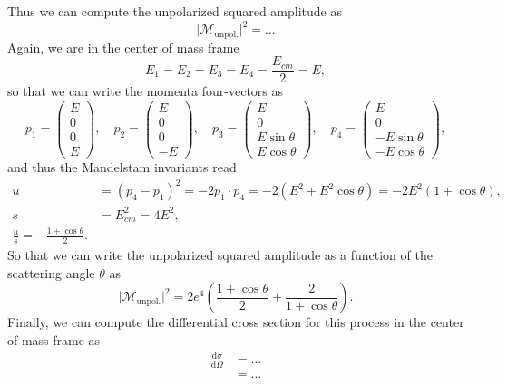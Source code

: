 Thus we can compute the unpolarized squared amplitude as
\[
    \vert \mathcal{M}_{\text{unpol.}} \vert^2 = \dots
\]
Again, we are in the center of mass frame
\[
    E_1 = E_2 = E_3 = E_4 = \frac{E_{cm}}{2} = E,
\]
so that we can write the momenta four-vectors as
\[
    p_1 = \begin{pmatrix}
        E \\
        0 \\
        0 \\
        E
    \end{pmatrix}, \quad p_2 = \begin{pmatrix}
        E \\
        0 \\
        0 \\
        -E
    \end{pmatrix}, \quad p_3 = \begin{pmatrix}
        E             \\
        0             \\
        E \sin \theta \\
        E \cos \theta
    \end{pmatrix}, \quad p_4 = \begin{pmatrix}
        E              \\
        0              \\
        -E \sin \theta \\
        -E \cos \theta
    \end{pmatrix},
\]
and thus the Mandelstam invariants read
\[
    \begin{aligned}
        u & = (p_4 - p_1)^2 = - 2 p_1 \cdot p_4 = -2 (E^2 + E^2 \cos \theta) = -2 E^2 (1 + \cos \theta), \\
        s & = E^2_{cm} = 4 E^2,                                                                          \\
        \frac{u}{s} = - \frac{1 + \cos \theta}{2}.
    \end{aligned}
\]
So that we can write the unpolarized squared amplitude as a function of the scattering angle \(\theta\) as
\[
    \vert \mathcal{M}_{\text{unpol.}} \vert^2 = 2 e^4 \left( \frac{1 + \cos \theta}{2} + \frac{2}{1 + \cos \theta} \right).
\]
Finally, we can compute the differential cross section for this process in the center of mass frame as
\[
    \begin{aligned}
        \frac{\mathrm{d} \sigma}{\mathrm{d} \Omega} & = \dots \\
                                                    & = \dots
    \end{aligned}
\]


